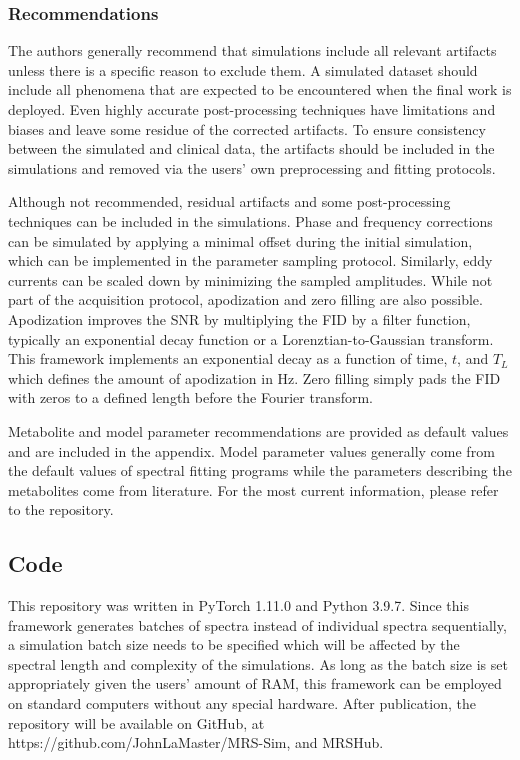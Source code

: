 \subsubsection{Recommendations}
The authors generally recommend that simulations include all relevant artifacts unless there is a specific reason to exclude them. A simulated dataset should include all phenomena that are expected to be encountered when the final work is deployed. Even highly accurate post-processing techniques have limitations and biases and leave some residue of the corrected artifacts. To ensure consistency between the simulated and clinical data, the artifacts should be included in the simulations and removed via the users’ own preprocessing and fitting protocols.  

Although not recommended, residual artifacts and some post-processing techniques can be included in the simulations. Phase and frequency corrections can be simulated by applying a minimal offset during the initial simulation, which can be implemented in the parameter sampling protocol. Similarly, eddy currents can be scaled down by minimizing the sampled amplitudes. While not part of the acquisition protocol, apodization and zero filling are also possible. Apodization improves the SNR by multiplying the FID by a filter function, typically an exponential decay function or a Lorenztian-to-Gaussian transform. This framework implements an exponential decay as a function of time, $t$, and $T_L$ which defines the amount of apodization in Hz. Zero filling simply pads the FID with zeros to a defined length before the Fourier transform.

Metabolite and model parameter recommendations are provided as default values and are included in the appendix. Model parameter values generally come from the default values of spectral fitting programs\cite{Oeltzschner2020,Provencher1993,Simpson2017} while the parameters describing the metabolites come from literature\cite{deGraaf2007,deGraaf2018,Gudmundson2023,Landheer2021,Wermter2017,Wyss2018}. For the most current information, please refer to the repository. 

\subsection{Code}
This repository was written in PyTorch 1.11.0 and Python 3.9.7. Since this framework generates batches of spectra instead of individual spectra sequentially, a simulation batch size needs to be specified which will be affected by the spectral length and complexity of the simulations. As long as the batch size is set appropriately given the users' amount of RAM, this framework can be employed on standard computers without any special hardware. After publication, the repository will be available on GitHub, at https://github.com/JohnLaMaster/MRS-Sim, and MRSHub.


